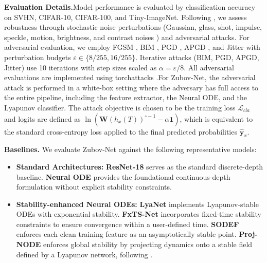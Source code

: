 \documentclass[journal]{IEEEtran}
\begin{document}
\noindent \textbf{Evaluation Details.}\quad Model performance is evaluated by classification accuracy on SVHN, CIFAR-10, CIFAR-100, and Tiny-ImageNet. Following \cite{CUI2023576, YAN2020On}, we assess robustness through stochastic noise perturbations (Gaussian, glass, shot, impulse, speckle, motion, brightness, and contrast noises   \cite{hendrycks2018benchmarking}) and adversarial attacks. For adversarial evaluation, we employ FGSM \cite{goodfellow2014explaining}, BIM \cite{kurakin2018adversarial}, PGD \cite{madry2018towards}, APGD \cite{pmlr-v119-croce20b}, and Jitter \cite{schwinn2023exploring} with perturbation budgets $\varepsilon \in \{8/255, 16/255\}$. Iterative attacks (BIM, PGD, APGD, Jitter) use 10 iterations with step sizes scaled as $\alpha = \varepsilon/8$. All adversarial evaluations are implemented using torchattacks \cite{kim2020torchattacks}.For Zubov-Net, the adversarial attack is performed in a white-box setting where the adversary has full access to the entire pipeline, including the feature extractor, the Neural ODE, and the Lyapunov classifier. The attack objective is chosen to be the training loss $\mathcal{L}_{cla}$ and logits are defined as $\ln(\mathbf{W}(h_x(T))^{\circ -1} - \alpha \mathbf{1})$, which is equivalent to the standard cross-entropy loss applied to the final predicted probabilities $\hat{\mathbf{y}}_x$.

\noindent\textbf{Baselines.} We evaluate Zubov-Net against the following representative models:
\begin{itemize}
	\item \textbf{Standard Architectures:}
		\textbf{ResNet-18} \cite{He_2016_CVPR} serves as the standard discrete-depth baseline.  \textbf{Neural ODE} \cite{NEURIPS2018_69386f6b} provides the foundational continuous-depth formulation without explicit stability constraints.
	
	\item \textbf{Stability-enhanced Neural ODEs:}
	\textbf{LyaNet} \cite{pmlr-v162-rodriguez22a} implements Lyapunov-stable ODEs with exponential stability.
	\textbf{FxTS-Net} \cite{LUO2025107219} incorporates fixed-time stability constraints to ensure convergence within a user-defined time.
	\textbf{SODEF} \cite{NEURIPS2021_7d5430cf} enforces each clean training feature as an asymptotically stable point.
	\textbf{Proj-NODE} enforces global stability by projecting dynamics onto a stable field defined by a Lyapunov network, following \cite{NEURIPS2019_0a4bbced, Chu_Wei_Liu_Zhao_Miyatake_2024}.
\end{itemize}
\end{document}
